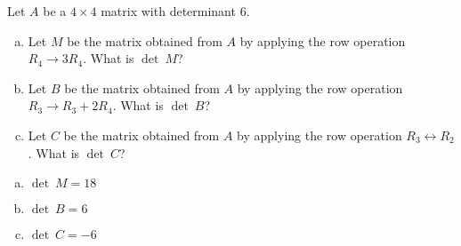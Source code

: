 
\begin{exerciseStatement}


Let \(A\) be a \(4 \times 4\) matrix with determinant \( 6 \).


\begin{enumerate}[(a)]
\item Let \(M\) be the matrix obtained from \(A\) by applying the row operation \( R_4 \to 3R_4 \). What is \(\operatorname{det}\ M\)?
\item Let \(B\) be the matrix obtained from \(A\) by applying the row operation \( R_3 \to R_3 + 2R_4 \). What is \(\operatorname{det}\ B\)?
\item Let \(C\) be the matrix obtained from \(A\) by applying the row operation \( R_3 \leftrightarrow R_2 \). What is \(\operatorname{det}\ C\)?
\end{enumerate}
    
\end{exerciseStatement}
    
\begin{exerciseAnswer} 

\begin{enumerate}[(a)]
\item \(\operatorname{det}\ M= 18 \)
\item \(\operatorname{det}\ B= 6 \)
\item \(\operatorname{det}\ C= -6 \)
\end{enumerate}
    
\end{exerciseAnswer}
    
